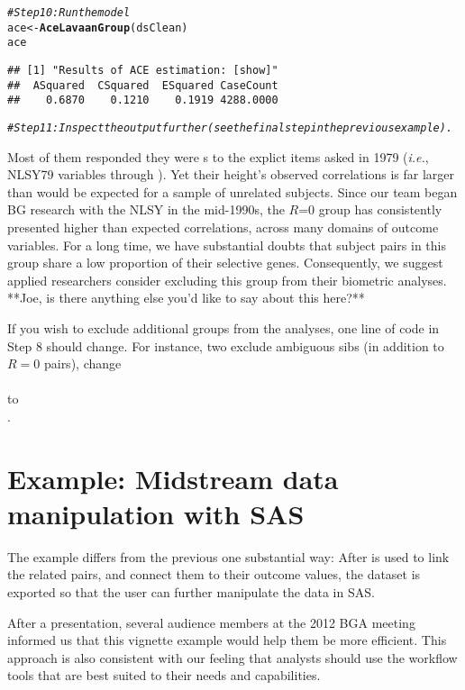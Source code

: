 \documentclass{article}\usepackage[]{graphicx}\usepackage[]{color}
\makeatletter
\newcommand{\hlcom}[1]{\textcolor[rgb]{0.678,0.584,0.686}{\textit{#1}}}%
\newcommand{\hlstd}[1]{\textcolor[rgb]{0.345,0.345,0.345}{#1}}%
\newcommand{\hlkwb}[1]{\textcolor[rgb]{0.69,0.353,0.396}{#1}}%
\newcommand{\hlkwd}[1]{\textcolor[rgb]{0.737,0.353,0.396}{\textbf{#1}}}%
\newenvironment{kframe}{%
 \def\at@end@of@kframe{}%
 \ifinner\ifhmode%
  \def\at@end@of@kframe{\end{minipage}}%
  \begin{minipage}{\columnwidth}%
 \fi\fi%
 \def\FrameCommand##1{\hskip\@totalleftmargin \hskip-\fboxsep
 \colorbox{shadecolor}{##1}\hskip-\fboxsep
     \hskip-\linewidth \hskip-\@totalleftmargin \hskip\columnwidth}%
 \MakeFramed {\advance\hsize-\width
   \@totalleftmargin\z@ \linewidth\hsize
   \@setminipage}}%
 {\par\unskip\endMakeFramed%
 \at@end@of@kframe}
\newenvironment{knitrout}{}{} %
\makeatother
\begin{document}
\begin{knitrout}
\begin{kframe}
\begin{alltt}
\hlcom{#Step 10: Run the model}
\hlstd{ace} \hlkwb{<-} \hlkwd{AceLavaanGroup}\hlstd{(dsClean)}
\hlstd{ace}
\end{alltt}
\begin{verbatim}
## [1] "Results of ACE estimation: [show]"
##  ASquared  CSquared  ESquared CaseCount 
##    0.6870    0.1210    0.1919 4288.0000
\end{verbatim}
\begin{alltt}
\hlcom{#Step 11: Inspect the output further (see the final step in the previous example).}
\end{alltt}
\end{kframe}
\end{knitrout}


Most of them responded they were s  to the explict items asked in 1979 (\emph{i.e.}, NLSY79 variables  through ).  Yet their height's observed correlations is far larger than would be expected for a sample of unrelated subjects.  Since our team began BG research with the NLSY in the mid-1990s, the $R$=0 group has consistently presented higher than expected correlations, across many domains of outcome variables.  For a long time, we have substantial doubts that subject pairs in this group share a low proportion of their selective genes.  Consequently, we suggest applied researchers consider excluding this group from their biometric analyses.  **Joe, is there anything else you'd like to say about this here?**

If you wish to exclude additional groups from the analyses, one line of code in Step 8 should change.  For instance, two exclude ambiguous sibs (in addition to $R=0$ pairs), change\\  \\to \\ .

\section{Example: Midstream data manipulation with SAS}
The example differs from the previous one substantial way: After \R{} is used to link the related pairs, and connect them to their outcome values, the dataset is exported so that the user can further manipulate the data in SAS.  

After a presentation, several audience members at the 2012 BGA meeting informed us that this vignette example would help them be more efficient.  This approach is also consistent with our feeling that analysts should use the workflow tools that are best suited to their needs and capabilities.
\end{document}
